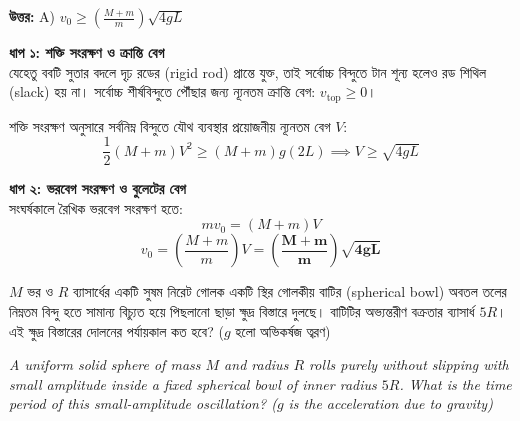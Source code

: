 \documentclass[12pt, a4paper]{article}
\begin{document}
\vspace{0.5em}
\begin{tcolorbox}[answerbox]
    \textbf{\color{success} উত্তর:} A) $v_0 \ge \left(\frac{M + m}{m}\right) \sqrt{4 g L}$
\end{tcolorbox}
\vspace{1em}

\begin{tcolorbox}[solutionbox={সমাধান (Solution)}]
    \noindent
    \textbf{ধাপ ১: শক্তি সংরক্ষণ ও ক্রান্তি বেগ} \\
    যেহেতু ববটি সুতার বদলে দৃঢ় রডের (rigid rod) প্রান্তে যুক্ত, তাই সর্বোচ্চ বিন্দুতে টান শূন্য হলেও রড শিথিল (slack) হয় না। সর্বোচ্চ শীর্ষবিন্দুতে পৌঁছার জন্য ন্যূনতম ক্রান্তি বেগ: $v_{\text{top}} \ge 0$।
    
    শক্তি সংরক্ষণ অনুসারে সর্বনিম্ন বিন্দুতে যৌথ ব্যবস্থার প্রয়োজনীয় ন্যূনতম বেগ $V$:
    \[ \frac{1}{2} (M + m) V^2 \ge (M + m) g (2L) \implies V \ge \sqrt{4 g L} \]
    
    \vspace{0.5em}
    \noindent\textbf{ধাপ ২: ভরবেগ সংরক্ষণ ও বুলেটের বেগ} \\
    সংঘর্ষকালে রৈখিক ভরবেগ সংরক্ষণ হতে:
    \[ m v_0 = (M + m) V \]
    \[ v_0 = \left(\frac{M + m}{m}\right) V = \mathbf{\left(\frac{M + m}{m}\right) \sqrt{4 g L}} \]
\end{tcolorbox}

\newpage

\begin{tcolorbox}[questionbox={প্রশ্ন (Question) 37}]
    \noindent
    $M$ ভর ও $R$ ব্যাসার্ধের একটি সুষম নিরেট গোলক একটি স্থির গোলকীয় বাটির (spherical bowl) অবতল তলের নিম্নতম বিন্দু হতে সামান্য বিচ্যুত হয়ে পিছলানো ছাড়া ক্ষুদ্র বিস্তারে দুলছে। বাটিটির অভ্যন্তরীণ বক্রতার ব্যাসার্ধ $5R$। এই ক্ষুদ্র বিস্তারের দোলনের পর্যায়কাল কত হবে? ($g$ হলো অভিকর্ষজ ত্বরণ)
    
    \vspace{0.8em}
    \begin{english}
    \noindent\textit{\color{darkgray}
    A uniform solid sphere of mass $M$ and radius $R$ rolls purely without slipping with small amplitude inside a fixed spherical bowl of inner radius $5R$. What is the time period of this small-amplitude oscillation? ($g$ is the acceleration due to gravity)
    }
    \end{english}
\end{tcolorbox}
\end{document}
